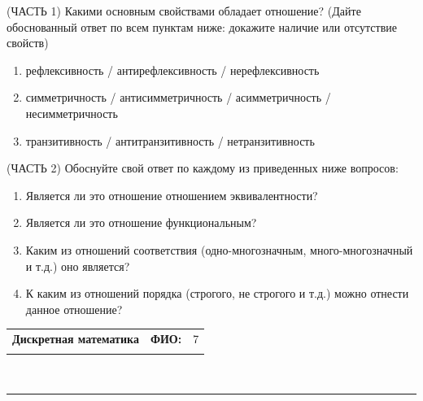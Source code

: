 \documentclass[10pt]{exam}
\newcommand{\class}{Дискретная математика}
\newcommand{\examdate}{}
\begin{document}
\begin{questions}
(ЧАСТЬ 1) Какими основным свойствами обладает отношение? (Дайте обоснованный ответ по всем пунктам ниже: докажите наличие или отсутствие свойств)  
\begin{enumerate}
	\renewcommand{\labelenumi}{\alph{enumi})}
	\item рефлексивность / антирефлексивность / нерефлексивность
	\item симметричность / антисимметричность / асимметричность / несимметричность
	\item транзитивность / антитранзитивность / нетранзитивность
\end{enumerate}

(ЧАСТЬ 2) Обоснуйте свой ответ по каждому из приведенных ниже вопросов:
\begin{enumerate}
	\renewcommand{\labelenumi}{\alph{enumi})}
    \item Является ли это отношение отношением эквивалентности?
    \item Является ли это отношение функциональным?
    \item Каким из отношений соответствия (одно-многозначным, много-многозначный и т.д.) оно является?
    \item К каким из отношений порядка (строгого, не строгого и т.д.) можно отнести данное отношение?
\end{enumerate}


\end{questions}
\newpage
\begin{flushright}
\begin{tabular}{p{2.8in} r l}
\textbf{\class} & \textbf{ФИО:} &7\\

\textbf{\examdate} &&\\
\end{tabular}\\
\end{flushright}
\rule[1ex]{\textwidth}{.1pt}
\end{document}
